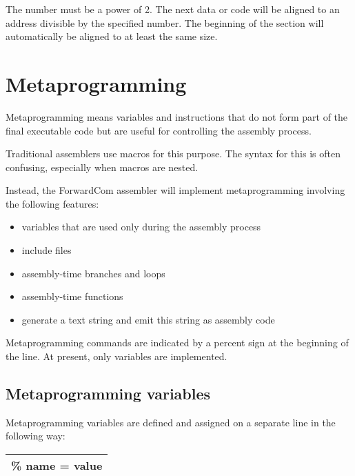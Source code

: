 \documentclass[forwardcom.tex]{subfiles}
\begin{document}
The number must be a power of 2. The next data or code will be aligned to an address divisible by the specified number. The beginning of the section will automatically be aligned to at least the same size.
\vspace{2mm}


\section{Metaprogramming} \label{assemblyMetaprogramming}
Metaprogramming means variables and instructions that do not form part of the final executable code but 
are useful for controlling the assembly process.
\vspace{2mm}

Traditional assemblers use macros for this purpose. The syntax for this is often confusing, especially when macros are nested.
\vspace{2mm}

Instead, the ForwardCom assembler will implement metaprogramming involving the following features:

\begin{itemize}
\item variables that are used only during the assembly process
\item include files
\item assembly-time branches and loops
\item assembly-time functions
\item generate a text string and emit this string as assembly code
\end{itemize}

Metaprogramming commands are indicated by a percent sign at the beginning of the line.
At present, only variables are implemented.
\vspace{2mm}


\subsection{Metaprogramming variables} \label{MetaprogrammingVariables}

Metaprogramming variables are defined and assigned on a separate line in the following way:
\vspace{2mm}

\begin{tabular}{|p{154mm}|}
\hline
\hspace{4mm} \% name = value\\
\hline
\end{tabular}
\vspace{4mm}
\end{document}
